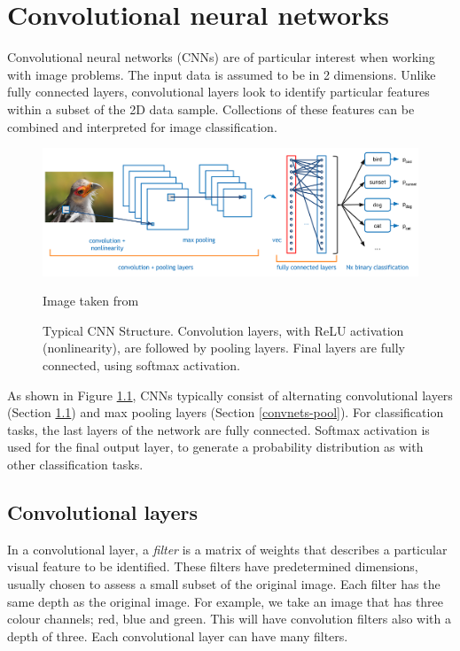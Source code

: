 %
%

\chapter{Convolutional neural networks}\label{convnets}

Convolutional neural networks (CNNs) are of particular interest when working with image problems. The input data is assumed to be in 2 dimensions. Unlike fully connected layers, convolutional layers look to identify particular features within a subset of the 2D data sample. Collections of these features can be combined and interpreted for image classification.

\begin{figure}[ht]
	\centering
	\includegraphics[width=\textwidth]{Images/4_cnn_structure.png}
	\caption{Typical CNN Structure. Convolution layers, with ReLU activation (nonlinearity), are followed by pooling layers. Final layers are fully connected, using softmax activation.}
	\small Image taken from \cite{ADeshpande2016}
	\label{convnets-structurefig}
\end{figure}

As shown in Figure \ref{convnets-structurefig}, CNNs typically consist of alternating convolutional layers (Section \ref{convnets-convlayer}) and max pooling layers (Section \ref{convnets-pool}). For classification tasks, the last layers of the network are fully connected. Softmax activation is used for the final output layer, to generate a probability distribution as with other classification tasks.

\section{Convolutional layers}\label{convnets-convlayer}

In a convolutional layer, a \textit{filter} is a matrix of weights that describes a particular visual feature to be identified. These filters have predetermined dimensions, usually chosen to assess a small subset of the original image. Each filter has the same depth as the original image. For example, we take an image that has three colour channels; red, blue and green. This will have convolution filters also with a depth of three. Each convolutional layer can have many filters.

